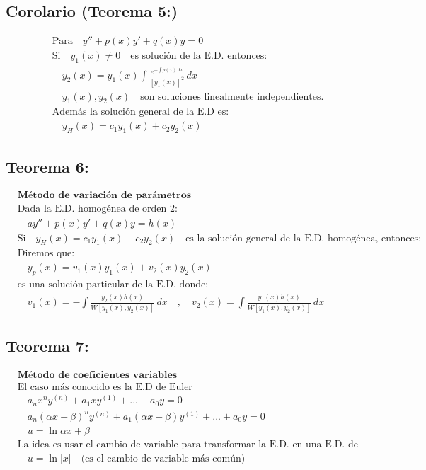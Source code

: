 \documentclass[a4paper,12pt,numbers=noenddot]{scrreprt}
\begin{document}
\subsection*{Corolario (Teorema 5:)}
\begin{align*}
    &\text{Para} \quad y'' + p(x)y' + q(x)y = 0 \\
    &\text{Si} \quad y_1(x) \not = 0 \quad \text{es solución de la E.D. entonces:}\\
    &\quad y_2(x) = y_1(x) \int \frac{e^{-\int p(x)\,dx}}{[y_1(x)]^2} \,dx\\
    &\quad {y_1(x), y_2(x)} \quad \text{son soluciones linealmente independientes.}\\
    &\text{Además la solución general de la E.D es:}\\
    &\quad y_H(x) = c_1y_1(x) + c_2y_2(x)
\end{align*}

\subsection*{Teorema 6:}
\begin{align*}
    &\textbf{Método de variación de parámetros}\\
    &\text{Dada la E.D. homogénea de orden 2:}\\
    &\quad a y'' + p(x) y' + q(x) y = h(x)\\
    &\text{Si} \quad y_H(x) = c_1y_1(x) + c_2y_2(x) \quad \text{es la solución general de la E.D. homogénea, entonces:}\\
    &\text{Diremos que:}\\
    &\quad y_p(x) = v_1(x)y_1(x) + v_2(x)y_2(x)\\
    &\text{es una solución particular de la E.D. donde:}\\
    &\quad v_1(x) = -\int \frac{y_2(x)h(x)}{W[y_1(x),y_2(x)]} \,dx \quad , \quad v_2(x) = \int \frac{y_1(x)h(x)}{W[y_1(x),y_2(x)]} \,dx
\end{align*}

\subsection*{Teorema 7:}
\begin{align*}
    &\textbf{Método de coeficientes variables}\\
    &\text{El caso más conocido es la E.D de Euler}\\
    &\quad a_n x^n y^{(n)} + a_{1} x y^{(1)} + ... + a_0 y = 0\\
    &\quad a_n(\alpha x + \beta)^n y^{(n)} + a_{1}(\alpha x + \beta) y^{(1)} + ... + a_0 y = 0\\
    &\quad u = \ln{\alpha x + \beta}\\
    &\text{La idea es usar el cambio de variable para transformar la E.D. en una E.D. de coeficientes constantes.}\\
    &\quad u= \ln |x| \quad \text{(es el cambio de variable más común)}
\end{align*} 
\end{document}
